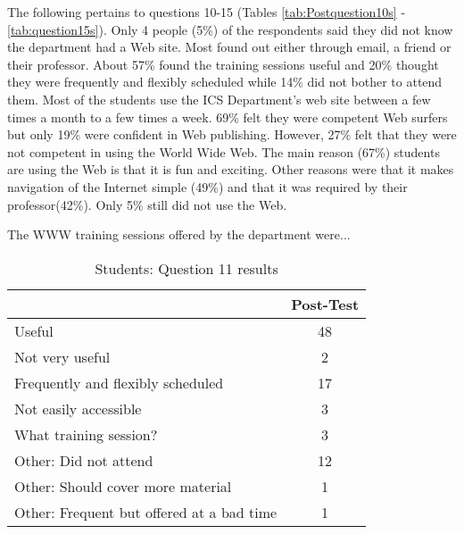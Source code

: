 The following pertains to questions 10-15 (Tables \ref{tab:Postquestion10s} -
\ref{tab:question15s}).  Only 4 people (5\%) of the respondents said they did
not know the department had a Web site.  Most found out either through email, a
friend or their professor.  About 57\% found the training sessions useful and
20\% thought they were frequently and flexibly scheduled while 14\% did not
bother to attend them.  Most of the students use the ICS Department's web site
between a few times a month to a few times a week.  69\% felt they were
competent Web surfers but only 19\% were confident in Web publishing.  However,
27\% felt that they were not competent in using the World Wide Web.  The main
reason (67\%) students are using the Web is that it is fun and exciting.  Other
reasons were that it makes navigation of the Internet simple (49\%) and that it
was required by their professor(42\%).  Only 5\% still did not use the Web.

\begin{table}[htbp]
\caption{Students: Question 11 results}
{The WWW training sessions offered by the department were...}
\begin{center}
\begin{tabular}{|l|c|} \hline
  & {\bf Post-Test} \\ \hline 
 {Useful} & 48 \\ \hline 
 {Not very useful} & 2 \\ \hline 
 {Frequently and flexibly scheduled} & 17 \\ \hline 
 {Not easily accessible} & 3 \\ \hline 
 {What training session?} & 3 \\ \hline 
 {Other: Did not attend} & 12 \\ \hline 
 {Other: Should cover more material} & 1 \\ \hline 
 {Other: Frequent but offered at a bad time} & 1 \\ \hline 
\end{tabular}
\end{center}
\label{tab:question11s}
\end{table}

